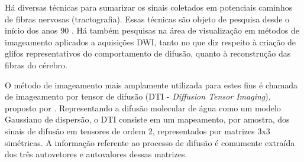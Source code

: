 \documentclass[
    12pt,                %
    oneside,            %
    a4paper,            %
    english,            %
    french,                %
    spanish,            %
    brazil                %
    ]{abntex2}
\begin{document}





Há diversas técnicas para sumarizar os sinais coletados em potenciais caminhos de fibras nervosas (tractografia). Essas técnicas são objeto de pesquisa desde o início dos anos 90 \cite{descoteaux2015}. Há também pesquisas na área de visualização em métodos de imageamento aplicados a aquisições DWI, tanto no que diz respeito à criação de glifos representativos do comportamento de difusão, quanto à reconstrução das fibras do cérebro.

O método de imageamento mais amplamente utilizada para estes fins é chamada de imageamento por tensor de difusão (DTI - \textit{Diffusion Tensor Imaging}), proposto por . %
Representando a difusão molecular de água como um modelo Gaussiano de dispersão,  o DTI consiste em um mapeamento, por amostra, dos sinais de difusão em tensores de ordem 2, representados por matrizes 3x3 simétricas. A informação referente ao processo de difusão é comumente extraída dos três autovetores e autovalores dessas matrizes.
\end{document}

